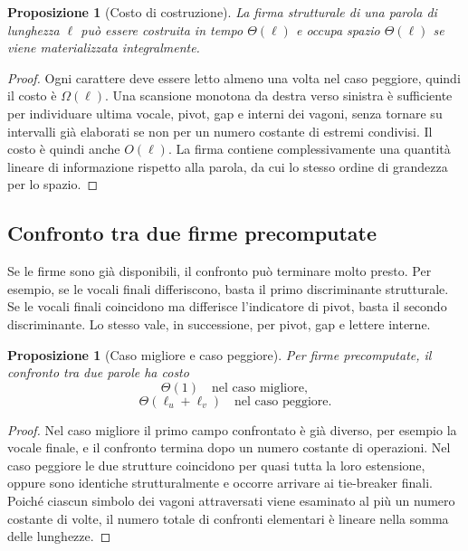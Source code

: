 \documentclass[11pt,a4paper]{article}
\newtheorem{proposizione}[teorema]{Proposizione}
\theoremstyle{definition}
\theoremstyle{remark}
\begin{document}
\begin{proposizione}[Costo di costruzione]
La firma strutturale di una parola di lunghezza $\ell$ può essere costruita in tempo $\Theta(\ell)$ e occupa spazio $\Theta(\ell)$ se viene materializzata integralmente.
\end{proposizione}

\begin{proof}
Ogni carattere deve essere letto almeno una volta nel caso peggiore, quindi il costo è $\Omega(\ell)$. Una scansione monotona da destra verso sinistra è sufficiente per individuare ultima vocale, pivot, gap e interni dei vagoni, senza tornare su intervalli già elaborati se non per un numero costante di estremi condivisi. Il costo è quindi anche $O(\ell)$. La firma contiene complessivamente una quantità lineare di informazione rispetto alla parola, da cui lo stesso ordine di grandezza per lo spazio.
\end{proof}

\subsection{Confronto tra due firme precomputate}

Se le firme sono già disponibili, il confronto può terminare molto presto. Per esempio, se le vocali finali differiscono, basta il primo discriminante strutturale. Se le vocali finali coincidono ma differisce l'indicatore di pivot, basta il secondo discriminante. Lo stesso vale, in successione, per pivot, gap e lettere interne.

\begin{proposizione}[Caso migliore e caso peggiore]
Per firme precomputate, il confronto tra due parole ha costo
\[
  \Theta(1) \quad\text{nel caso migliore},
\]
\[
  \Theta(\ell_u+\ell_v) \quad\text{nel caso peggiore}.
\]
\end{proposizione}

\begin{proof}
Nel caso migliore il primo campo confrontato è già diverso, per esempio la vocale finale, e il confronto termina dopo un numero costante di operazioni. Nel caso peggiore le due strutture coincidono per quasi tutta la loro estensione, oppure sono identiche strutturalmente e occorre arrivare ai tie-breaker finali. Poiché ciascun simbolo dei vagoni attraversati viene esaminato al più un numero costante di volte, il numero totale di confronti elementari è lineare nella somma delle lunghezze.
\end{proof}
\end{document}
